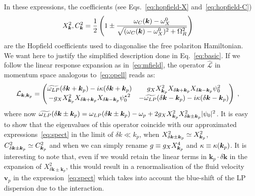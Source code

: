 In these expressions, the coefficients (see Eqs.~\eqref{eq:hopfield-X}
and~\eqref{eq:hopfield-C}) 
%
\begin{equation}
  X^2_{\bm{k}}, C^2_{\bm{k}} = \frac{1}{2} \left(1 \pm \frac{\omega_C(\bm{k}) -
    \omega_X^0}{\sqrt{(\omega_C(\bm{k}) - \omega_X^0)^2 +
      \Omega_R^2}}\right)
\end{equation}
%
are the Hopfield coefficients used to diagonalise the free polariton
Hamiltonian. We want here to justify the simplified description done
in Eq.~\eqref{eq:basic}. If we follow the linear response expansion as
in~\eqref{eq:mfield}, the operator $\hat{\mathcal{L}}$ in momentum
space analogous to~\eqref{eq:opell} reads as:
%
\begin{equation}
  \mathcal{L}_{\bm{k},\bm{k}_p} = \begin{pmatrix}
    \widetilde{\omega_{LP}} (\delta \bm{k}+\bm{k}_p) - i
    \kappa(\delta \bm{k}+\bm{k}_p) & g_X X_{\bm{k}_p}^2 X_{\delta
      \bm{k}+\bm{k}_p} X_{\delta \bm{k}-\bm{k}_p} \psi_0^2
    \\ - g_X X_{\bm{k}_p}^2 X_{\delta \bm{k}+\bm{k}_p} X_{\delta
      \bm{k}-\bm{k}_p}{\psi_0^{\star}}^2 & -
    \widetilde{\omega_{LP}}(\delta \bm{k}-\bm{k}_p) -
    i\kappa(\delta \bm{k}-\bm{k}_p) \end{pmatrix}\; ,
\label{eq:opel2}
\end{equation}
%
where now $\widetilde{\omega_{LP}} (\delta \bm{k} \pm\bm{k}_p) =
\omega_{LP} (\delta \bm{k} \pm\bm{k}_p) -\omega_p + 2 g_X X_{\bm{k}_p}^2
X_{\delta \bm{k} \pm \bm{k}_p}^2 |\psi_0|^2$. It is easy to show that
the eigenvalues of this operator coincide with our approximated
expressions~\eqref{eq:spect} in the limit of $\delta k \ll k_p$,
when $X_{\delta \bm{k} \pm \bm{k}_p}^2 \simeq X_{\bm{k}_p}^2$, $C_{\delta
\bm{k} \pm \bm{k}_p}^2 \simeq C_{\bm{k}_p}^2$ and when we can simply
rename $g \equiv g_X X_{\bm{k}_p}^4$ and $\kappa \equiv
\kappa(\bm{k}_p)$. It is interesting to note that, even if we would
retain the linear terms in $\bm{k}_p \cdot \delta \bm{k}$ in the
expansion of $X_{\delta \bm{k} \pm \bm{k}_p}^2$, this would result in
a renormalisation of the fluid velocity $\bm{v}_p$ in the
expression~\eqref{eq:spect} which takes into account the blue-shift of
the LP dispersion due to the interaction.




